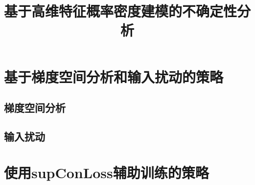 \documentclass{article}
\title{基于高维特征概率密度建模的不确定性分析}
\begin{document}
\maketitle
\section{基于梯度空间分析和输入扰动的策略}

\subsection{梯度空间分析}


\subsection{输入扰动}




\section{使用supConLoss辅助训练的策略}
\end{document}
